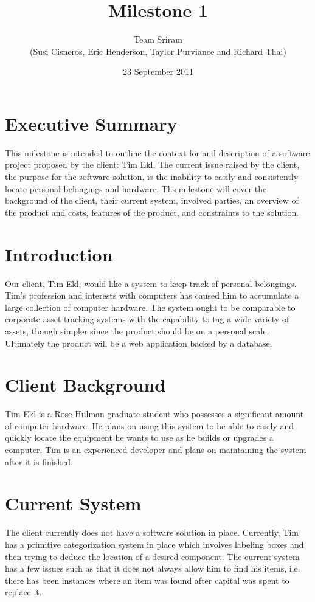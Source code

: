 \documentclass{article}
\begin{document}
\setlength{\voffset}{3.5in}
\title{Milestone 1}
\author{Team Sriram\\
(Susi Cisneros, Eric Henderson, Taylor Purviance and Richard Thai)}
\date{23 September 2011}
\maketitle
\clearpage
\setlength{\voffset}{0pt}
\tableofcontents
\clearpage
\section{Executive Summary}
This milestone is intended to outline the context for and description of a software project proposed by the client: Tim Ekl. The current issue raised by the client, the purpose for the software solution, is the inability to easily and consistently locate personal belongings and hardware. Ths milestone will cover the background of the client, their current system, involved parties, an overview of the product and costs, features of the product, and constraints to the solution.

\section{Introduction}
Our client, Tim Ekl, would like a system to keep track of personal belongings. Tim's profession and interests with computers has caused him to accumulate a large collection of computer hardware. The system ought to be comparable to corporate asset-tracking systems with the capability to tag a wide variety of assets, though simpler since the product should be on a personal scale. Ultimately the product will be a web application backed by a database.

\section{Client Background}
Tim Ekl is a Rose-Hulman graduate student who possesses a significant amount of computer hardware.  He plans on using this system to be able to easily and quickly locate the equipment he wants to use as he builds or upgrades a computer.  Tim is an experienced developer and plans on maintaining the system after it is finished.  

\section{Current System}
The client currently does not have a software solution in place.  Currently, Tim has a primitive categorization system in place which involves labeling boxes and then trying to deduce the location of a desired component.  The current system has a few issues such as that it does not always allow him to find his items, i.e. there has been instances where an item was found after capital was spent to replace it.
\end{document}
